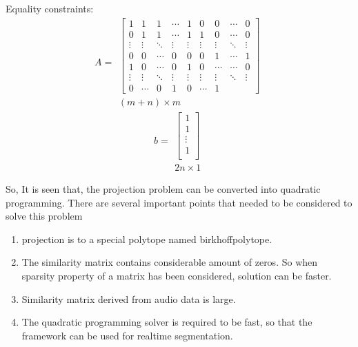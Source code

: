 Equality constraints:
\[A=
\begin{array}{c}
    \begin{bmatrix}
        1 & 1 & 1 & \cdots & 1 & 0 & 0 & \cdots & 0\\
        0 & 1 & 1 & \cdots & 1 & 1 & 0 & \cdots & 0\\
        \vdots & \vdots & \ddots & \vdots & \vdots & \vdots & \vdots & \ddots & \vdots\\
        0 & 0 & \cdots & 0 & 0 & 0 & 1 & \cdots & 1\\
        1 & 0 & \cdots & 0 & 1 & 0 & \cdots & \cdots  & 0 \\
        \vdots & \vdots & \ddots & \vdots & \vdots & \vdots & \vdots & \ddots & \vdots\\
        0 & \cdots & 0 & 1 & 0 & \cdots & 1 
    \end{bmatrix}\\
    (m+n)\times m
\end{array}
\]
\[b=
\begin{array}{c}
    \begin{bmatrix}
        1 \\
        1 \\
        \vdots\\
        1 \\
    \end{bmatrix}\\
    2n \times 1
\end{array}
\]

So, It is seen that, the projection problem can be converted into quadratic programming. There are several important points that needed to be considered to solve this problem
\begin{enumerate}
	\item projection is to a special polytope named birkhoffpolytope.
	\item The similarity matrix contains considerable amount of zeros. So when sparsity property of a matrix has been considered, solution can be faster.
	\item Similarity matrix derived from audio data is large.
	\item The quadratic programming solver is required to be fast, so that the framework can be used for realtime segmentation.
\end{enumerate}


